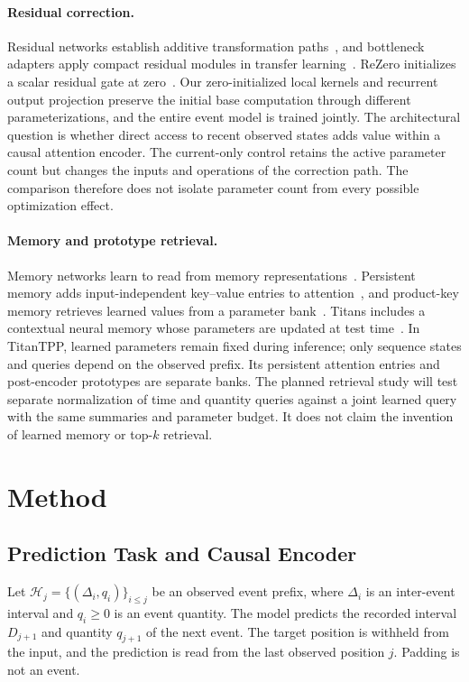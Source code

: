 \documentclass[runningheads]{llncs}
\newcommand{\method}{TitanTPP}
\newcommand{\Hcal}{\mathcal{H}}
\begin{document}
\paragraph{Residual correction.}
Residual networks establish additive transformation paths~\cite{he2016residual}, and bottleneck adapters apply compact residual modules in transfer learning~\cite{houlsby2019adapters}. ReZero initializes a scalar residual gate at zero~\cite{bachlechner2021rezero}. Our zero-initialized local kernels and recurrent output projection preserve the initial base computation through different parameterizations, and the entire event model is trained jointly. The architectural question is whether direct access to recent observed states adds value within a causal attention encoder. The current-only control retains the active parameter count but changes the inputs and operations of the correction path. The comparison therefore does not isolate parameter count from every possible optimization effect.

\paragraph{Memory and prototype retrieval.}
Memory networks learn to read from memory representations~\cite{sukhbaatar2015memory}. Persistent memory adds input-independent key--value entries to attention~\cite{sukhbaatar2019memory}, and product-key memory retrieves learned values from a parameter bank~\cite{lample2019product}. Titans includes a contextual neural memory whose parameters are updated at test time~\cite{behrouz2025titans}. In \method, learned parameters remain fixed during inference; only sequence states and queries depend on the observed prefix. Its persistent attention entries and post-encoder prototypes are separate banks. The planned retrieval study will test separate normalization of time and quantity queries against a joint learned query with the same summaries and parameter budget. It does not claim the invention of learned memory or top-$k$ retrieval.

\section{Method}
\subsection{Prediction Task and Causal Encoder}
Let $\Hcal_j=\{(\Delta_i,q_i)\}_{i\leq j}$ be an observed event prefix, where $\Delta_i$ is an inter-event interval and $q_i\geq0$ is an event quantity. The model predicts the recorded interval $D_{j+1}$ and quantity $q_{j+1}$ of the next event. The target position is withheld from the input, and the prediction is read from the last observed position $j$. Padding is not an event.
\end{document}
